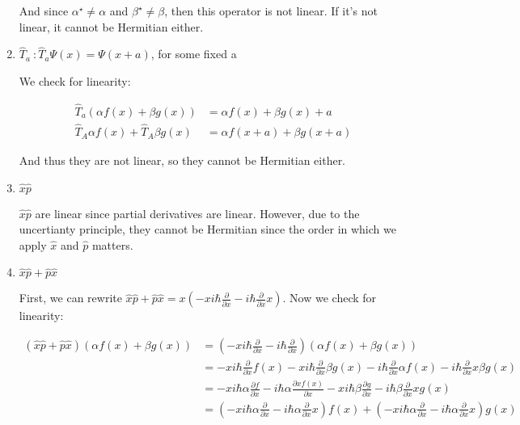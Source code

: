 \documentclass{article}
\begin{document}
\begin{enumerate}[label=(\alph*)]
\begin{solution}
        And since $\alpha^\star \neq \alpha$ and $\beta^\star \neq \beta$, then this operator is not linear. If it's not linear, it cannot be Hermitian either.
    \end{solution}
    \item $\hat T_a \ : \hat T_a\Psi(x) = \Psi(x+a)$, for some fixed a
    
    \begin{solution}
        We check for linearity: 

        \begin{align*}
            \hat T_a (\alpha f(x) + \beta g(x)) &= \alpha f(x) + \beta g(x) + a\\
            \hat T_A \alpha f(x) + \hat T_A \beta g(x) &= \alpha f(x+a) + \beta g(x+a)
        \end{align*}

        And thus they are not linear, so they cannot be Hermitian either.
    \end{solution}
    \item $\hat x\hat p$
    
    \begin{solution}
        $\hat x \hat p$ are linear since partial derivatives are linear. However, due to the uncertianty principle, they cannot be Hermitian since the order in which we apply $\hat x$ and $\hat p$ matters.
    \end{solution}
    \item $\hat x \hat p + \hat p \hat x$ 
    
    \begin{solution}
        First, we can rewrite $\hat x \hat p + \hat p \hat x = x\left(-xi\hbar \frac{\partial}{\partial x} - i\hbar \frac{\partial}{\partial x} x\right)$. Now we check for linearity:

        \begin{align*}
            (\hat x \hat p + \hat p \hat x)(\alpha f(x) + \beta g(x)) &= \left(-xi\hbar \frac{\partial}{\partial x} - i\hbar \frac{\partial}{\partial x} \right)(\alpha f(x) + \beta g(x))\\
            &= -x i\hbar \frac{\partial}{\partial x} f(x) - xi\hbar \frac{\partial}{\partial x} \beta g(x) - i\hbar \frac{\partial}{\partial x} \alpha f(x) - i\hbar \frac{\partial}{\partial x} x\beta g(x)\\
            &= -x i\hbar \alpha \frac{\partial f}{\partial x} - i\hbar \alpha \frac{\partial xf(x)}{\partial x} - xi \hbar \beta \frac{\partial g}{\partial x} - i\hbar \beta \frac{\partial}{\partial x} xg(x)\\
            &= \left(-xi\hbar \alpha \frac{\partial}{\partial x} - i\hbar \alpha \frac{\partial}{\partial x} x \right) f(x) +\left(-xi\hbar \alpha \frac{\partial}{\partial x} - i\hbar \alpha \frac{\partial}{\partial x} x \right) g(x) 
        \end{align*}


\end{solution}
\end{enumerate}
\end{document}
